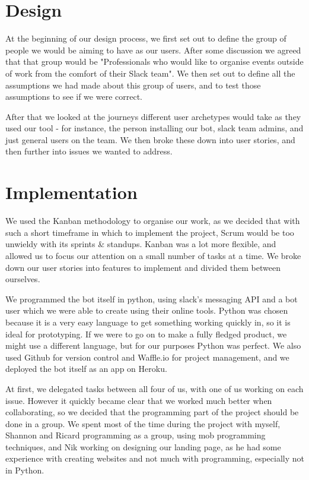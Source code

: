 \documentclass{report}
\begin{document}
\section{Design}
At the beginning of our design process, we first set out to define the group of people we would be aiming to have as our users. After some discussion we agreed that that group would be "Professionals who would like to organise events outside of work from the comfort of their Slack team". We then set out to define all the assumptions we had made about this group of users, and to test those assumptions to see if we were correct.

After that we looked at the journeys different user archetypes would take as they used our tool - for instance, the person installing our bot, slack team admins, and just general users on the team. We then broke these down into user stories, and then further into issues we wanted to address.

\section{Implementation}
We used the Kanban methodology to organise our work, as we decided that with such a short timeframe in which to implement the project, Scrum would be too unwieldy with its sprints \& standups. Kanban was a lot more flexible, and allowed us to focus our attention on a small number of tasks at a time. We broke down our user stories into features to implement and divided them between ourselves.

We programmed the bot itself in python, using slack's messaging API and a bot user which we were able to create using their online tools. Python was chosen because it is a very easy language to get something working quickly in, so it is ideal for prototyping. If we were to go on to make a fully fledged product, we might use a different language, but for our purposes Python was perfect. We also used Github for version control and Waffle.io for project management, and we deployed the bot itself as an app on Heroku.

At first, we delegated tasks between all four of us, with one of us working on each issue. However it quickly became clear that we worked much better when collaborating, so we decided that the programming part of the project should be done in a group. We spent most of the time during the project with myself, Shannon and Ricard programming as a group, using mob programming techniques, and Nik working on designing our landing page, as he had some experience with creating websites and not much with programming, especially not in Python.
\end{document}
